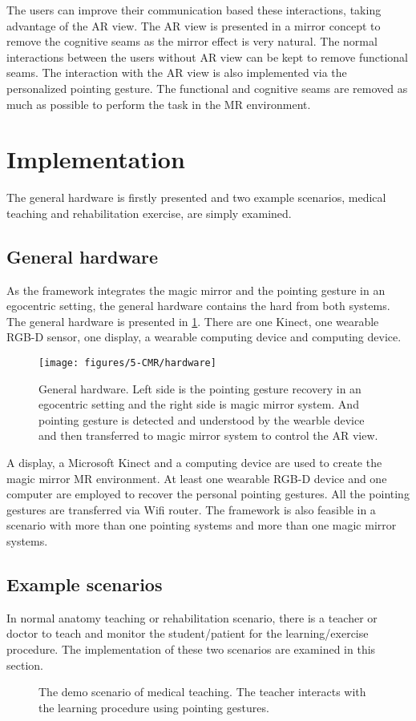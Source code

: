 The users can improve their communication based these interactions, taking advantage of the AR view. The AR view is presented in a mirror concept to remove the cognitive seams as the mirror effect is very natural. The normal interactions between the users without AR view can be kept to remove functional seams. The interaction with the AR view is also implemented via the personalized pointing gesture. The functional and cognitive seams are removed as much as possible to perform the task in the MR environment.

\section{Implementation}
The general hardware is firstly presented and two example scenarios, medical teaching and rehabilitation exercise, are simply examined.

\subsection{General hardware}
As the framework integrates the magic mirror and the pointing gesture in an egocentric setting, the general hardware contains the hard from both systems. The general hardware is presented in \figurename{\ref{fig:5:hardware}}. There are one Kinect, one wearable RGB-D sensor, one display, a wearable computing device and computing device. 
\begin{figure}
\centering
\texttt{[image: figures/5-CMR/hardware]}
\caption{General hardware. Left side is the pointing gesture recovery in an egocentric setting and the right side is magic mirror system. And pointing gesture is detected and understood by the wearble device and then transferred to magic mirror system to control the AR view.}
\label{fig:5:hardware}
\end{figure}
A display, a Microsoft Kinect and a computing device are used to create the magic mirror MR environment. At least one wearable RGB-D device and one computer are employed to recover the personal pointing gestures. All the pointing gestures are transferred via Wifi router. The framework is also feasible in a scenario with more than one pointing systems and more than one magic mirror systems. 
 
\subsection{Example scenarios}
In normal anatomy teaching or rehabilitation scenario, there is a teacher or doctor to teach and monitor the student/patient for the learning/exercise procedure. The implementation of these two scenarios are examined in this section.
\begin{figure}
	\centering
	\quad
	\caption{The demo scenario of medical teaching. The teacher interacts with the learning procedure using pointing gestures.}
	\label{fig:5:implementation}
\end{figure}

